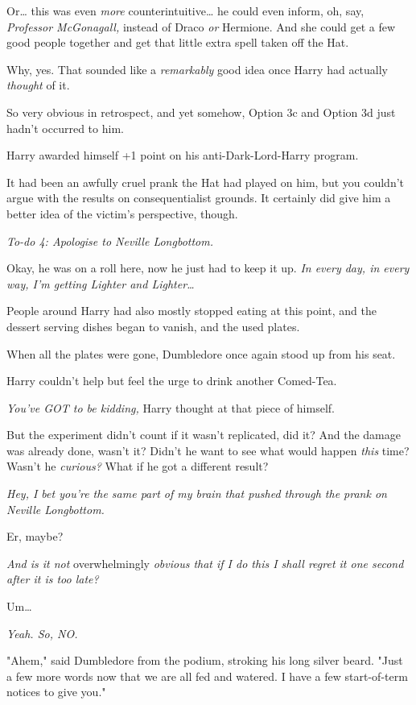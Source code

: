 Or{\ldots} this was even \emph{more} counterintuitive{\ldots} he could even 
inform, oh, say, \emph{Professor McGonagall,} instead of Draco \emph{or} 
Hermione. And she could get a few good people together and get that little 
extra spell taken off the Hat.

Why, yes. That sounded like a \emph{remarkably} good idea once Harry had 
actually \emph{thought} of it.

So very obvious in retrospect, and yet somehow, Option 3c and Option 3d just 
hadn't occurred to him.

Harry awarded himself +1 point on his anti-Dark-Lord-Harry program.

It had been an awfully cruel prank the Hat had played on him, but you couldn't 
argue with the results on consequentialist grounds. It certainly did give him a 
better idea of the victim's perspective, though.

\emph{To-do 4: Apologise to Neville Longbottom.}

Okay, he was on a roll here, now he just had to keep it up. \emph{In every day, 
in every way, I'm getting Lighter and Lighter{\ldots}}

People around Harry had also mostly stopped eating at this point, and the 
dessert serving dishes began to vanish, and the used plates.

When all the plates were gone, Dumbledore once again stood up from his seat.

Harry couldn't help but feel the urge to drink another Comed-Tea.

\emph{You've GOT to be kidding,} Harry thought at that piece of himself.

But the experiment didn't count if it wasn't replicated, did it? And the damage 
was already done, wasn't it? Didn't he want to see what would happen 
\emph{this} time? Wasn't he \emph{curious?} What if he got a different result?

\emph{Hey, I bet you're the same part of my brain that pushed through the prank 
on Neville Longbottom.}

Er, maybe?

\emph{And is it not} overwhelmingly \emph{obvious that if I do this I shall 
regret it one second after it is too late?}

Um{\ldots}

\emph{Yeah. So, NO.}

"Ahem," said Dumbledore from the podium, stroking his long silver beard. "Just 
a few more words now that we are all fed and watered. I have a few 
start-of-term notices to give you."

